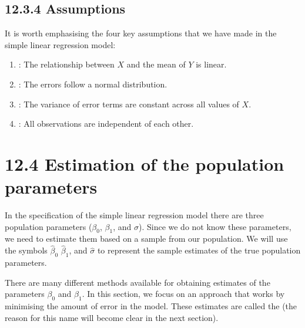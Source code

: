 \documentclass[letterpaper,10pt,english]{jupyterBook}
\begin{document}
\subsection{12.3.4 Assumptions}
\label{\detokenize{12.d. Linear Regression I:assumptions}}
\sphinxAtStartPar
It is worth emphasising the four key assumptions that we have made in the simple linear regression model:
\begin{enumerate}
%
\item {} 
\sphinxAtStartPar
{}: The relationship between \(X\) and the mean of \(Y\) is linear.

\item {} 
\sphinxAtStartPar
{}: The errors follow a normal distribution.

\item {} 
\sphinxAtStartPar
{}: The variance of error terms are constant across all values of \(X\).

\item {} 
\sphinxAtStartPar
{}: All observations are independent of each other.

\end{enumerate}


\section{12.4 Estimation of the population parameters}
\label{\detokenize{12.e. Linear Regression I:estimation-of-the-population-parameters}}\label{\detokenize{12.e. Linear Regression I::doc}}
\sphinxAtStartPar
In the specification of the simple linear regression model there are three population parameters (\(\beta_0\), \(\beta_1\), and \(\sigma\)). Since we do not know these parameters, we need to estimate them based on a sample from our population. We will use the symbols \(\hat{\beta}_0\) \(\hat{\beta}_1\), and \(\hat{\sigma}\) to represent the sample estimates of the true population parameters.

\sphinxAtStartPar
There are many different methods available for obtaining estimates of the parameters \(\beta_0\) and \(\beta_1\). In this section, we focus on an approach that works by minimising the amount of error in the model. These estimates are called the  (the reason for this name will become clear in the next section).
\end{document}
